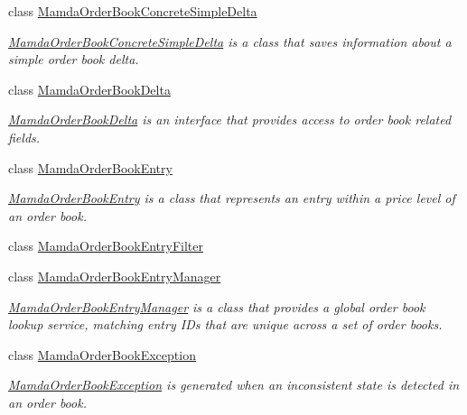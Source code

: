 \begin{CompactItemize}
class \hyperlink{classWombat_1_1MamdaOrderBookConcreteSimpleDelta}{Mamda\-Order\-Book\-Concrete\-Simple\-Delta}
\begin{CompactList}\small\item\em \hyperlink{classWombat_1_1MamdaOrderBookConcreteSimpleDelta}{Mamda\-Order\-Book\-Concrete\-Simple\-Delta} is a class that saves information about a simple order book delta. \item\end{CompactList}\item 
class \hyperlink{classWombat_1_1MamdaOrderBookDelta}{Mamda\-Order\-Book\-Delta}
\begin{CompactList}\small\item\em \hyperlink{classWombat_1_1MamdaOrderBookDelta}{Mamda\-Order\-Book\-Delta} is an interface that provides access to order book related fields. \item\end{CompactList}\item 
class \hyperlink{classWombat_1_1MamdaOrderBookEntry}{Mamda\-Order\-Book\-Entry}
\begin{CompactList}\small\item\em \hyperlink{classWombat_1_1MamdaOrderBookEntry}{Mamda\-Order\-Book\-Entry} is a class that represents an entry within a price level of an order book. \item\end{CompactList}\item 
class \hyperlink{classWombat_1_1MamdaOrderBookEntryFilter}{Mamda\-Order\-Book\-Entry\-Filter}
\item 
class \hyperlink{classWombat_1_1MamdaOrderBookEntryManager}{Mamda\-Order\-Book\-Entry\-Manager}
\begin{CompactList}\small\item\em \hyperlink{classWombat_1_1MamdaOrderBookEntryManager}{Mamda\-Order\-Book\-Entry\-Manager} is a class that provides a global order book lookup service, matching entry IDs that are unique across a set of order books. \item\end{CompactList}\item 
class \hyperlink{classWombat_1_1MamdaOrderBookException}{Mamda\-Order\-Book\-Exception}
\begin{CompactList}\small\item\em \hyperlink{classWombat_1_1MamdaOrderBookException}{Mamda\-Order\-Book\-Exception} is generated when an inconsistent state is detected in an order book. \item\end{CompactList}\item 

\end{CompactItemize}
